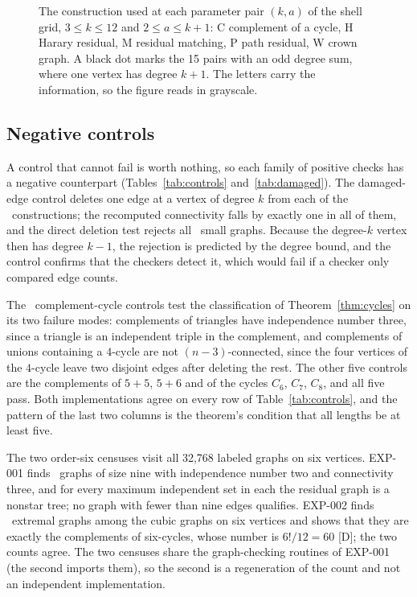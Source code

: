 \begin{figure}[ht]
\centering

\caption{The construction used at each parameter pair $(k,a)$ of the shell grid, $3\le k\le12$ and $2\le a\le k+1$: C complement of a cycle, H Harary residual, M residual matching, P path residual, W crown graph. A black dot marks the 15 pairs with an odd degree sum, where one vertex has degree $k+1$. The letters carry the information, so the figure reads in grayscale.}
\label{fig:grid}
\end{figure}

\subsection{Negative controls}\label{sec:res-controls}

A control that cannot fail is worth nothing, so each family of positive checks has a negative counterpart (Tables~\ref{tab:controls} and~\ref{tab:damaged}).
The damaged-edge control deletes one edge at a vertex of degree $k$ from each of the \NDamaged\ constructions; the recomputed connectivity falls by exactly one in all of them, and the direct deletion test rejects all \NDirect\ small graphs.
Because the degree-$k$ vertex then has degree $k-1$, the rejection is predicted by the degree bound, and the control confirms that the checkers detect it, which would fail if a checker only compared edge counts.



The \NCycleControls\ complement-cycle controls test the classification of Theorem~\ref{thm:cycles} on its two failure modes: complements of triangles have independence number three, since a triangle is an independent triple in the complement, and complements of unions containing a $4$-cycle are not $(n-3)$-connected, since the four vertices of the $4$-cycle leave two disjoint edges after deleting the rest.
The other five controls are the complements of $5+5$, $5+6$ and of the cycles $C_6$, $C_7$, $C_8$, and all five pass.
Both implementations agree on every row of Table~\ref{tab:controls}, and the pattern of the last two columns is the theorem's condition that all lengths be at least five.



The two order-six censuses visit all 32,768 labeled graphs on six vertices.
EXP-001 finds \NExtremalSix\ graphs of size nine with independence number two and connectivity three, and for every maximum independent set in each the residual graph is a nonstar tree; no graph with fewer than nine edges qualifies.
EXP-002 finds \NExtremalSix\ extremal graphs among the cubic graphs on six vertices and shows that they are exactly the complements of six-cycles, whose number is $6!/12=60$ [D]; the two counts agree.
The two censuses share the graph-checking routines of EXP-001 (the second imports them), so the second is a regeneration of the count and not an independent implementation.

